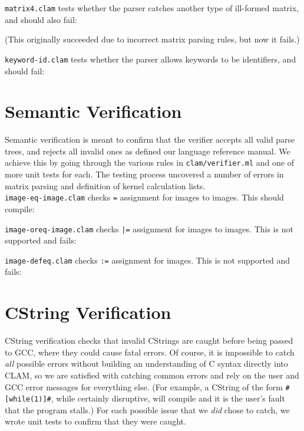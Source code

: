 \texttt{matrix4.clam} tests whether the parser catches another type of ill-formed matrix, and should also fail:

(This originally succeeded due to incorrect matrix parsing rules, but now it fails.)

\texttt{keyword-id.clam} tests whether the parser allows keywords to be identifiers, and should fail:



\section{Semantic Verification}
\label{testing:semantic}

Semantic verification is meant to confirm that the verifier accepts all valid parse trees,
and rejects all invalid ones as defined our language reference manual.
We achieve this by going through the various rules in \texttt{clam/verifier.ml}
and one of more unit tests for each. The testing process uncovered a number of errors
in matrix parsing and definition of kernel calculation lists.\\

\texttt{image-eq-image.clam} checks \texttt{=} assignment for images to images. This should compile:


\texttt{image-oreq-image.clam} checks \texttt{|=} assignment for images to images. This is not supported and fails:


\texttt{image-defeq.clam} checks \texttt{:=} assignment for images. This is not supported and fails:


\section{CString Verification}
\label{testing:cstrings}

CString verification checks that invalid CStrings are caught before being passed to GCC, where they
could cause fatal errors. Of course, it is impossible to catch \emph{all} possible errors without
building an understanding of C syntax directly into CLAM, so we are satisfied with catching common
errors and rely on the user and GCC error messages for everything else. (For example, a CString of the form \texttt{\#[while(1)]\#},
while certainly disruptive, will compile and it is the user's fault that the program stalls.)
For each possible issue that we \emph{did} chose to catch, we wrote unit tests to confirm that they were caught.\\



